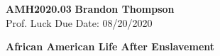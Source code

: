 \noindent
\textbf{AMH2020.03} \hfill \textbf{Brandon Thompson} \\
\normalsize Prof. Luck \hfill Due Date: 08/20/2020 \\

\begin{center}
\textbf{African American Life After Enslavement}
\end{center}